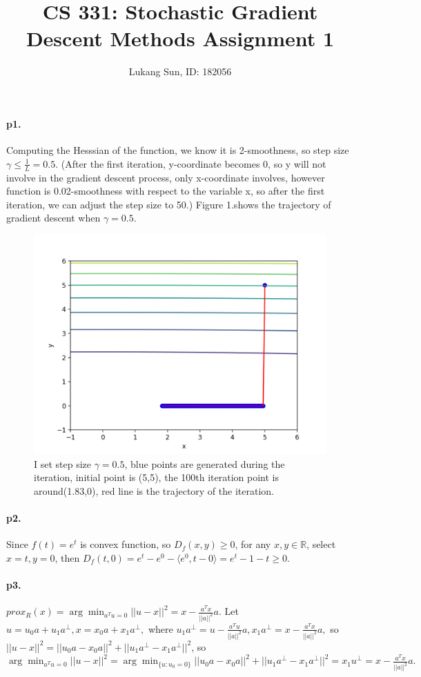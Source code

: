 \documentclass[12pt,a4paper]{article}
\title{CS 331: Stochastic Gradient Descent Methods Assignment 1}
\author{Lukang Sun, ID: 182056}
\begin{document}
	\maketitle
	\paragraph{p1.} Computing the Hesssian of the function, we know it is 2-smoothness, 
	so step size $\gamma\leq \frac{1}{L}=0.5.$ (After the first iteration, y-coordinate becomes 0, so y will not involve in the gradient descent process, only x-coordinate involves, however function is 0.02-smoothness with respect to the variable x, so after the first iteration, we can  adjust the step size to 50.) Figure 1.shows the trajectory of gradient descent when $\gamma = 0.5$.
	\begin{figure}
		\centering
		\includegraphics[width=0.7\linewidth]{"Figure_1"}
		\caption{I set step size $\gamma = 0.5$, blue points are generated during the iteration, initial point is (5,5), the 100th iteration point is around(1.83,0), red line is the trajectory of the iteration.}
		\label{fig:figure1-1}
	\end{figure}
	
	\paragraph{p2.} Since $f(t)=e^t$ is convex function, so $D_{f}(x,y)\geq 0$, for any $x,y\in \mathbb{R}$, select $x=t, y=0$, then 
	$D_f(t,0)=e^t-e^0-\langle e^0,t-0\rangle=e^t-1-t\geq 0.$
	
	\paragraph{p3.}$prox_R(x)=\arg\min_{a^Tu=0}||u-x||^2=x-\frac{a^Tx}{||a||^2}a.$ Let $u = u_0 a+u_1 a^{\perp}, x= x_0a+x_1a^{\perp},$  where $u_1a^{\perp}=u-\frac{a^Tu}{||a||^2}a, x_1a^{\perp}=x-\frac{a^Tx}{||a||^2}a,$ so $||u-x||^2 = ||u_0a-x_0a||^2+||u_1a^{\perp}-x_1a^{\perp}||^2$, so $\arg\min_{a^Tu=0}||u-x||^2=\arg\min_{\{u:u_0=0\}}||u_0a-x_0a||^2+||u_1a^{\perp}-x_1a^{\perp}||^2=x_1u^{\perp}=x-\frac{a^Tx}{||a||^2}a.$
	
\end{document}
